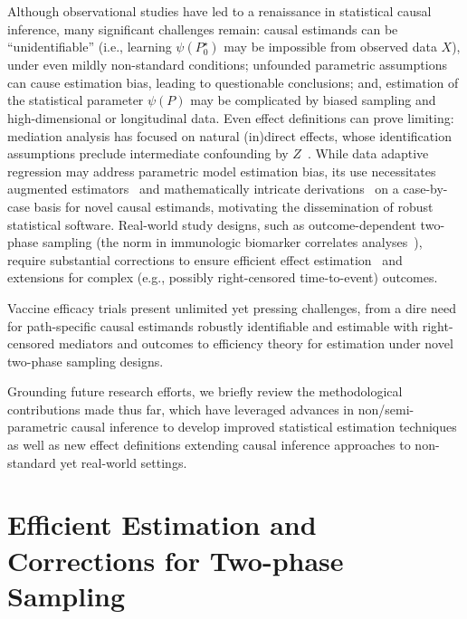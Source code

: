 Although observational studies have led to a renaissance in statistical causal
inference, many significant challenges remain: causal estimands can be
``unidentifiable'' (i.e., learning $\psi(P_0^{\star})$ may be impossible from
observed data $X$), under even mildly non-standard conditions; unfounded
parametric assumptions can cause estimation bias, leading to questionable
conclusions; and, estimation of the statistical parameter $\psi(P)$ may be
complicated by biased sampling and high-dimensional or longitudinal data. Even
effect definitions can prove limiting: mediation analysis has focused on natural
(in)direct effects, whose identification assumptions preclude intermediate
confounding by $Z$~\citep{petersen2006estimation, tchetgen2014identification,
miles2017partial, vanderweele2017mediation}. While data adaptive regression may
address parametric model estimation bias, its use necessitates augmented
estimators~\citep{pfanzagl1985contributions, vdl2011targeted, vdl2018targeted,
coyle2020targeted} and mathematically intricate
derivations~\citep{carone2018higher} on a case-by-case basis for novel causal
estimands, motivating the dissemination of robust statistical software.
Real-world study designs, such as outcome-dependent two-phase sampling (the norm
in immunologic biomarker correlates analyses~\citep{haynes2012immune}), require
substantial corrections to ensure efficient effect
estimation~\citep{hejazi2020efficient} and extensions for complex (e.g.,
possibly right-censored time-to-event) outcomes.

Vaccine efficacy trials present unlimited yet pressing challenges, from a dire
need for path-specific causal estimands robustly identifiable and estimable with
right-censored mediators and outcomes to efficiency theory for estimation under
novel two-phase sampling designs.

Grounding future research efforts, we briefly review the methodological
contributions made thus far, which have leveraged advances in
non/semi-parametric causal inference to develop improved statistical estimation
techniques as well as new effect definitions extending causal inference
approaches to non-standard yet real-world settings.

\section{Efficient Estimation and Corrections for Two-phase Sampling}

